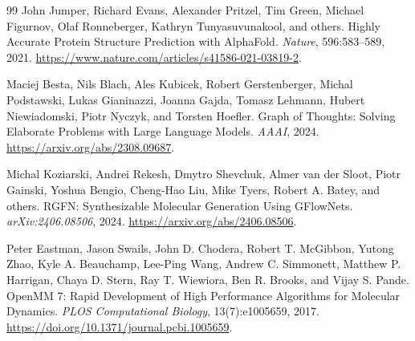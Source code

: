 \documentclass[11pt]{article}
\begin{document}
\begin{thebibliography}{99}
John Jumper, Richard Evans, Alexander Pritzel, Tim Green, Michael Figurnov, Olaf Ronneberger, Kathryn Tunyasuvunakool, and others.
\newblock Highly Accurate Protein Structure Prediction with AlphaFold.
\newblock \emph{Nature}, 596:583--589, 2021.
\newblock \url{https://www.nature.com/articles/s41586-021-03819-2}.

Maciej Besta, Nils Blach, Ales Kubicek, Robert Gerstenberger, Michal Podstawski, Lukas Gianinazzi, Joanna Gajda, Tomasz Lehmann, Hubert Niewiadomski, Piotr Nyczyk, and Torsten Hoefler.
\newblock Graph of Thoughts: Solving Elaborate Problems with Large Language Models.
\newblock \emph{AAAI}, 2024.
\newblock \url{https://arxiv.org/abs/2308.09687}.

Michal Koziarski, Andrei Rekesh, Dmytro Shevchuk, Almer van der Sloot, Piotr Gainski, Yoshua Bengio, Cheng-Hao Liu, Mike Tyers, Robert A. Batey, and others.
\newblock RGFN: Synthesizable Molecular Generation Using GFlowNets.
\newblock \emph{arXiv:2406.08506}, 2024.
\newblock \url{https://arxiv.org/abs/2406.08506}.

Peter Eastman, Jason Swails, John D. Chodera, Robert T. McGibbon, Yutong Zhao, Kyle A. Beauchamp, Lee-Ping Wang, Andrew C. Simmonett, Matthew P. Harrigan, Chaya D. Stern, Ray T. Wiewiora, Ben R. Brooks, and Vijay S. Pande.
\newblock OpenMM 7: Rapid Development of High Performance Algorithms for Molecular Dynamics.
\newblock \emph{PLOS Computational Biology}, 13(7):e1005659, 2017.
\newblock \url{https://doi.org/10.1371/journal.pcbi.1005659}.

\end{thebibliography}
\end{document}
